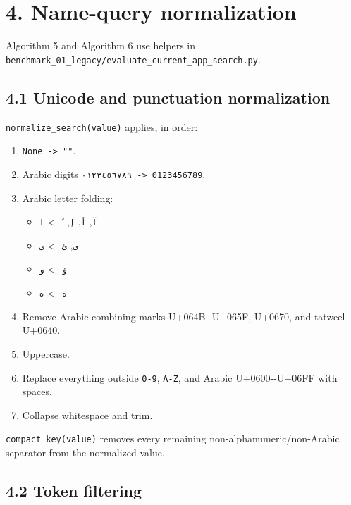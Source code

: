\section{4. Name-query normalization}\label{4-name-query-normalization}

Algorithm 5 and Algorithm 6 use helpers in \texttt{benchmark\_\allowbreak{}01\_\allowbreak{}legacy/evaluate\_\allowbreak{}current\_\allowbreak{}app\_\allowbreak{}search.py}.

\subsection{4.1 Unicode and punctuation normalization}\label{41-unicode-and-punctuation-normalization}

\texttt{normalize\_\allowbreak{}search(value)} applies, in order:

\begin{enumerate}
\def\labelenumi{\arabic{enumi}.}
\tightlist
\item
  \texttt{None\ -\textgreater{}\ ""}.
\item
  Arabic digits \texttt{٠١٢٣٤٥٦٧٨٩\ -\textgreater{}\ 0123456789}.
\item
  Arabic letter folding:

  \begin{itemize}
  \tightlist
  \item
    \texttt{آ}, \texttt{أ}, \texttt{إ}, \texttt{ٱ} -\textgreater{} \texttt{ا}
  \item
    \texttt{ى}, \texttt{ئ} -\textgreater{} \texttt{ي}
  \item
    \texttt{ؤ} -\textgreater{} \texttt{و}
  \item
    \texttt{ة} -\textgreater{} \texttt{ه}
  \end{itemize}
\item
  Remove Arabic combining marks U+064B-\/-U+065F, U+0670, and tatweel U+0640.
\item
  Uppercase.
\item
  Replace everything outside \texttt{0-9}, \texttt{A-Z}, and Arabic U+0600-\/-U+06FF with spaces.
\item
  Collapse whitespace and trim.
\end{enumerate}

\texttt{compact\_\allowbreak{}key(value)} removes every remaining non-alphanumeric/non-Arabic separator from the normalized value.

\subsection{4.2 Token filtering}\label{42-token-filtering}

